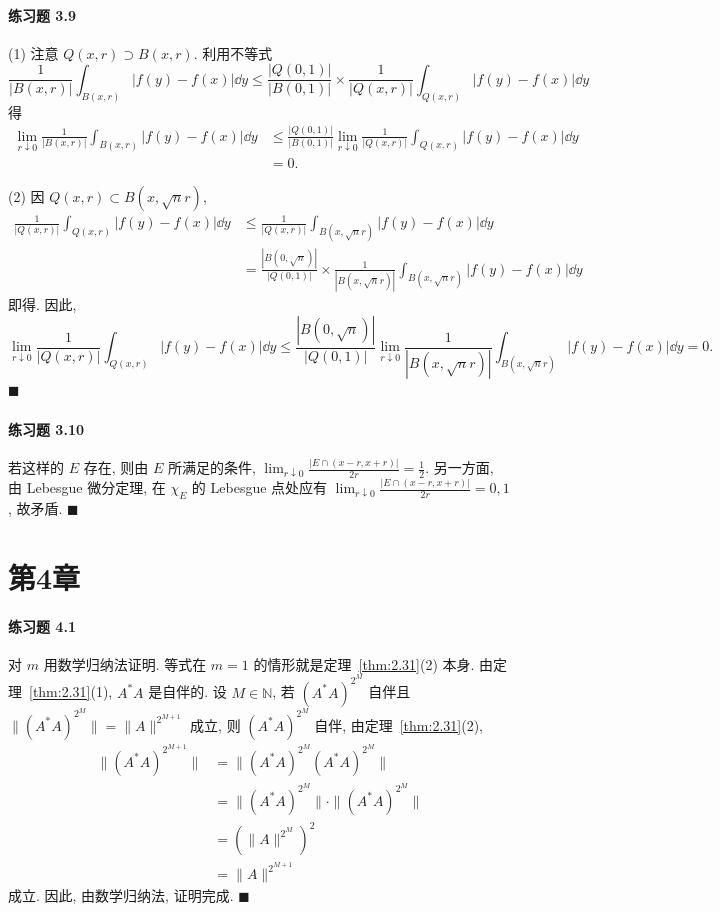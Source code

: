 \paragraph*{练习题 3.9}
(1) 注意 $Q(x,r) \supset B(x,r)$. 利用不等式
\[
\frac{1}{|B(x,r)|}\int_{B(x,r)}|f(y)-f(x)|\dd y \leq \frac{|Q(0,1)|}{|B(0,1)|} \times \frac{1}{|Q(x,r)|}\int_{Q(x,r)}|f(y)-f(x)|\dd y
\]
得
\begin{align*}
\lim_{r \downarrow 0}\frac{1}{|B(x,r)|}\int_{B(x,r)}|f(y)-f(x)|\dd y &\leq \frac{|Q(0,1)|}{|B(0,1)|}\lim_{r \downarrow 0}\frac{1}{|Q(x,r)|}\int_{Q(x,r)}|f(y)-f(x)|\dd y \\
&= 0.
\end{align*}

(2) 因 $Q(x,r) \subset B(x, \sqrt{n}r)$,
\begin{align*}
\frac{1}{|Q(x,r)|}\int_{Q(x,r)}|f(y)-f(x)|\dd y &\leq \frac{1}{|Q(x,r)|}\int_{B(x, \sqrt{n}r)}|f(y)-f(x)|\dd y \\
&= \frac{|B(0, \sqrt{n})|}{|Q(0,1)|} \times \frac{1}{|B(x, \sqrt{n}r)|}\int_{B(x, \sqrt{n}r)}|f(y)-f(x)|\dd y
\end{align*}
即得. 因此,
\[
\lim_{r \downarrow 0}\frac{1}{|Q(x,r)|}\int_{Q(x,r)}|f(y)-f(x)|\dd y \leq \frac{|B(0, \sqrt{n})|}{|Q(0,1)|}\lim_{r \downarrow 0}\frac{1}{|B(x, \sqrt{n}r)|}\int_{B(x, \sqrt{n}r)}|f(y)-f(x)|\dd y = 0.
\]
$\blacksquare$

\paragraph*{练习题 3.10}
若这样的 $E$ 存在, 则由 $E$ 所满足的条件, $\lim_{r\downarrow 0}\frac{|E\cap(x-r,x+r)|}{2r} = \frac{1}{2}$. 另一方面, 由 Lebesgue 微分定理, 在 $\chi_{E}$ 的 Lebesgue 点处应有 $\lim_{r\downarrow 0}\frac{|E\cap(x-r,x+r)|}{2r} = 0, 1$, 故矛盾. $\blacksquare$

\section*{第4章}

\paragraph*{练习题 4.1}
对 $m$ 用数学归纳法证明. 等式在 $m = 1$ 的情形就是定理~\ref{thm:2.31}(2) 本身. 由定理~\ref{thm:2.31}(1), $A^{*}A$ 是自伴的. 设 $M \in \mathbb{N}$, 若 $(A^{*}A)^{2^{M}}$ 自伴且 $\|(A^{*}A)^{2^{M}}\| = \|A\|^{2^{M+1}}$ 成立, 则 $(A^{*}A)^{2^{M}}$ 自伴, 由定理~\ref{thm:2.31}(2),
\begin{align*}
\|(A^{*}A)^{2^{M+1}}\| &= \|(A^{*}A)^{2^{M}}(A^{*}A)^{2^{M}}\| \\
&= \|(A^{*}A)^{2^{M}}\| \cdot \|(A^{*}A)^{2^{M}}\| \\
&= (\|A\|^{2^{M}})^{2} \\
&= \|A\|^{2^{M+1}}
\end{align*}
成立. 因此, 由数学归纳法, 证明完成. $\blacksquare$

